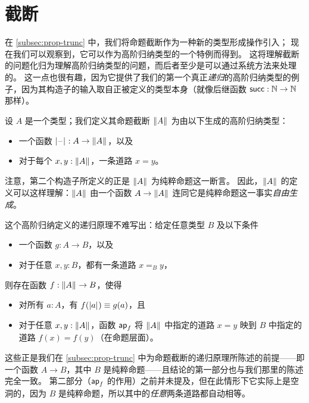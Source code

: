 \section{截断}
\label{sec:hittruncations}

%
在 \cref{subsec:prop-trunc} 中，我们将命题截断作为一种新的类型形成操作引入；
现在我们可以观察到，它可以作为高阶归纳类型的一个特例而得到。
这将理解截断的问题化归为理解高阶归纳类型的问题，而后者至少是可以通过系统方法来处理的。
这一点也很有趣，因为它提供了我们的第一个真正\emph{递归}的高阶归纳类型的例子，因为其构造子的输入取自正被定义的类型本身（就像后继函数 $\suc:\nat\to\nat$ 那样）。

设 $A$ 是一个类型；我们定义其命题截断 $\brck A$ 为由以下生成的高阶归纳类型：

\begin{itemize}
\item 一个函数 $\bprojf : A \to \brck A$，以及
\item 对于每个 $x,y:\brck A$，一条道路 $x=y$。
\end{itemize}

注意，第二个构造子所定义的正是 $\brck A$ 为纯粹命题这一断言。
因此，$\brck A$ 的定义可以这样理解：$\brck A$ 由一个函数 $A\to\brck A$ 连同它是纯粹命题这一事实\emph{自由生成}。

这个高阶归纳定义的递归原理不难写出：给定任意类型 $B$ 及以下条件

\begin{itemize}
\item 一个函数 $g:A\to B$，以及
\item 对于任意 $x,y:B$，都有一条道路 $x=_B y$，
\end{itemize}

则存在函数 $f:\brck A \to B$，使得

\begin{itemize}
\item 对所有 $a:A$，有 $f(\bproj a) \jdeq g(a)$，且
\item 对于任意 $x,y:\brck A$，函数 $\apfunc f$ 将 $\brck A$ 中指定的道路 $x=y$ 映到 $B$ 中指定的道路 $f(x) = f(y)$（在命题层面）。
\end{itemize}

%
这些正是我们在 \cref{subsec:prop-trunc} 中为命题截断的递归原理所陈述的前提——即一个函数 $A\to B$，其中 $B$ 是纯粹命题——且结论的第一部分也与我们那里的陈述完全一致。
第二部分（$\apfunc f$ 的作用）之前并未提及，但在此情形下它实际上是空洞的，因为 $B$ 是纯粹命题，所以其中的\emph{任意}两条道路都自动相等。


